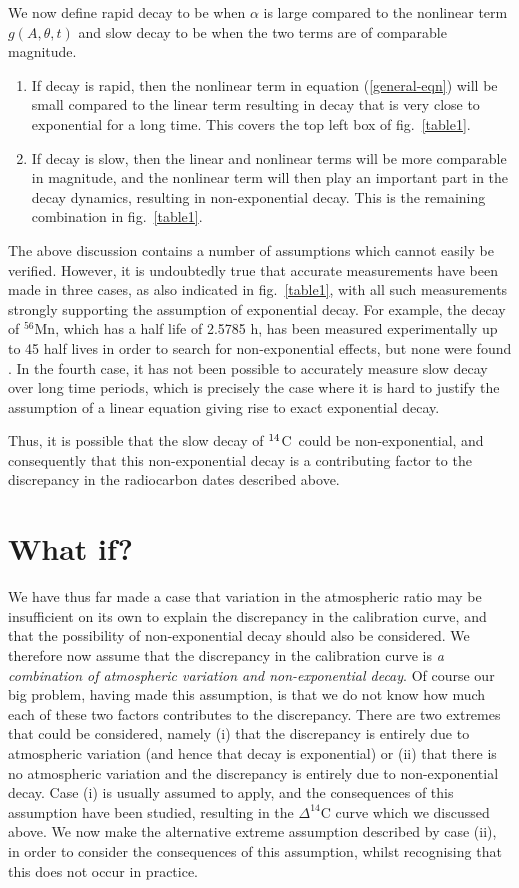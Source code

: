 \documentclass[12pt]{article}
\renewcommand{\Ref}[1]{(\ref{#1})}
\newcommand{\cft}{$^{\rm 14}$C}
\begin{document}
We now define rapid decay to be when $\alpha$ is large compared to 
the nonlinear term $g(A,\theta,t)$ and slow decay to be when the two terms 
are of comparable magnitude.
\begin{enumerate}
\item
If decay is rapid, then
the nonlinear term in equation \Ref{general-eqn} will be small compared 
to the linear term resulting in decay that is very close to exponential for
a long time. This covers the top left box of fig.~\ref{table1}.
\item
If decay is slow, then the linear and nonlinear 
terms will be more comparable in magnitude, and the nonlinear 
term will then play an important part in the decay dynamics, resulting
in non-exponential decay. This is the remaining combination in 
fig.~\ref{table1}.
\end{enumerate}

The above discussion contains a number of assumptions which cannot easily be
verified. However, it is undoubtedly true that accurate measurements 
have been made in three cases, as also indicated in fig.~\ref{table1}, 
with all such measurements strongly supporting the assumption of 
exponential decay. For example, the decay of $^{56}$Mn, which has a
half life of 2.5785 h, has been measured experimentally up to 45 half lives
in order to search for non-exponential effects, but none were found
\cite{norman88}. In the fourth case, it has not been possible to 
accurately measure slow decay over long time periods, which
is precisely the case where it is hard to justify the assumption of a linear
equation giving rise to exact exponential decay. 

Thus, it is possible that the slow decay of \cft~could be 
non-exponential, and consequently that this non-exponential decay is a 
contributing factor to the discrepancy in the radiocarbon dates described 
above.


\section{What if?}
\label{whatif}

We have thus far made a case that variation in the atmospheric ratio may be
insufficient on its own to explain the discrepancy in the calibration
curve, and that the possibility of non-exponential decay should also be
considered. We therefore now assume that the discrepancy in the 
calibration curve is {\em a combination of atmospheric variation and 
non-exponential decay}. Of course our big problem,
having made this assumption, is that we do not know how much each of these
two factors contributes to the discrepancy. There are two extremes that
could be considered, namely (i) that the discrepancy is
entirely due to atmospheric variation (and hence that decay is exponential) 
or (ii) that there is no atmospheric variation and the discrepancy is 
entirely due to non-exponential decay. 
Case (i) is usually assumed to apply, and the consequences of this
assumption have been studied, resulting in the $\Delta^{14}$C curve 
which we discussed above. We now make the alternative
extreme assumption described by case (ii), in order to consider the 
consequences of this assumption, whilst recognising that this does not
occur in practice.
\end{document}
